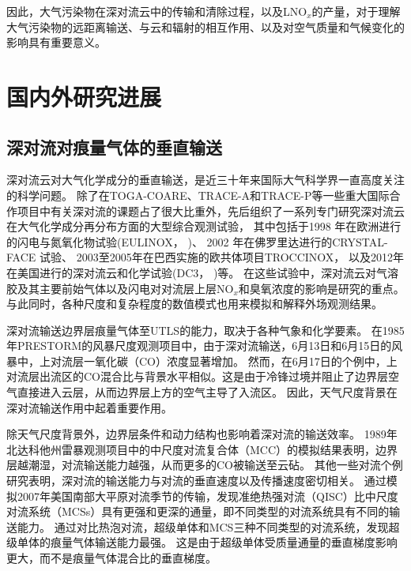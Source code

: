 因此，大气污染物在深对流云中的传输和清除过程，以及LNO$_x$的产量，对于理解大气污染物的远距离输送、与云和辐射的相互作用、以及对空气质量和气候变化的影响具有重要意义。



\section{国内外研究进展}

\subsection{深对流对痕量气体的垂直输送}

深对流云对大气化学成分的垂直输送，是近三十年来国际大气科学界一直高度关注的科学问题。
除了在TOGA-COARE\citep{Webster.1992}、TRACE-A\citep{Fishman.1996}和TRACE-P\citep{Jacob.2003}等一些重大国际合作项目中有关深对流的课题占了很大比重外，先后组织了一系列专门研究深对流云在大气化学成分再分布方面的大型综合观测试验，
其中包括于1998 年在欧洲进行的闪电与氮氧化物试验(EULINOX，\citeauthor{Holler.2000} \citeyear{Holler.2000})、
2002 年在佛罗里达进行的CRYSTAL-FACE 试验\citep{Toon.2003}、
2003至2005年在巴西实施的欧共体项目TROCCINOX\citep{Huntrieser.2008}，
以及2012年在美国进行的深对流云和化学试验(DC3，\citeauthor{Barth.2019} \citeyear{Barth.2019})等。
在这些试验中，深对流云对气溶胶及其主要前始气体以及闪电对对流层上层NO$_x$和臭氧浓度的影响是研究的重点。
与此同时，各种尺度和复杂程度的数值模式也用来模拟和解释外场观测结果。

深对流输送边界层痕量气体至UTLS的能力，取决于各种气象和化学要素。
在1985年PRESTORM的风暴尺度观测项目中，由于深对流输送，6月13日和6月15日的风暴中，上对流层一氧化碳（CO）浓度显著增加\citep{Dickerson.1987,Pickering.1989}。
然而，在6月17日的个例中，上对流层出流区的CO混合比与背景水平相似。这是由于冷锋过境并阻止了边界层空气直接进入云层，从而边界层上方的空气主导了入流区\citep{Pickering.1988}。
因此，天气尺度背景在深对流输送作用中起着重要作用。

除天气尺度背景外，边界层条件和动力结构也影响着深对流的输送效率。
1989年北达科他州雷暴观测项目中的中尺度对流复合体（MCC）的模拟结果表明，边界层越潮湿，对流输送能力越强，从而更多的CO被输送至云砧\citep{Stenchikov.1996}。
其他一些对流个例研究表明，深对流的输送能力与对流的垂直速度以及传播速度密切相关\citep{Pickering.1992a,Wang.1996}。
\citet{Bigelbach.2014}通过模拟2007年美国南部大平原对流季节的传输，发现准绝热强对流（QISC）比中尺度对流系统（MCSs）具有更强和更深的通量，即不同类型的对流系统具有不同的输送能力。
\citet{Li.2017b}通过对比热泡对流，超级单体和MCS三种不同类型的对流系统，发现超级单体的痕量气体输送能力最强。
这是由于超级单体受质量通量的垂直梯度影响更大，而不是痕量气体混合比的垂直梯度。

